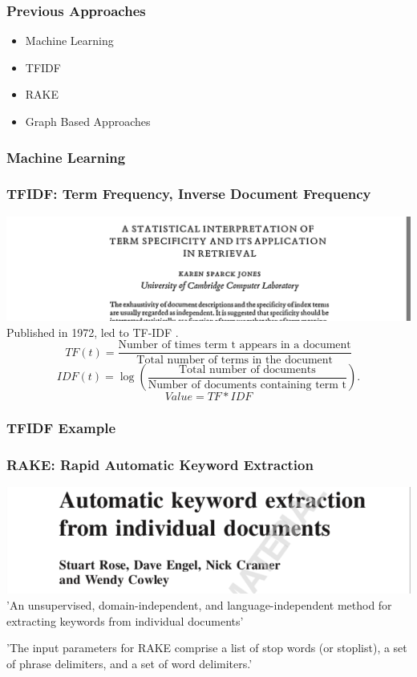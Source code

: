 \documentclass{beamer}
\begin{document}
\begin{frame}
\frametitle{Previous Approaches}
\begin{itemize}
\item Machine Learning
\vspace{0.5in}
\item TFIDF
\vspace{0.5in}
\item RAKE
\vspace{0.5in}
\item Graph Based Approaches
\end{itemize}

\end{frame}

\begin{frame}
\frametitle{Machine Learning}


\end{frame}

\begin{frame}
\frametitle{TFIDF: Term Frequency, Inverse Document Frequency}
\includegraphics[width= \textwidth]{img/tfidf}
\vspace{0.5cm}
Published in 1972, led to TF-IDF .
\vspace{0.5cm}
\[
TF(t) = \frac{\text{Number of times term t appears in a document}}{\text{Total number of terms in the document}}
\]
\[
IDF(t) = \log \left( \frac{\text{Total number of documents}}{{\text{Number of documents containing term t}}} \right).
\]
\[
Value = TF * IDF
\]
\end{frame}

\begin{frame}
\frametitle{TFIDF Example}
\end{frame}

\begin{frame}
\frametitle{RAKE: Rapid Automatic Keyword Extraction}
\includegraphics[width= \textwidth]{img/RAKE}
\vspace{1cm}
'An unsupervised, domain-independent, and language-independent method for extracting keywords from individual documents'
\vspace{0.5cm}

'The input parameters for RAKE comprise a list of stop words (or stoplist), a set of phrase delimiters, and a set of word delimiters.'
\end{frame}
\end{document}
